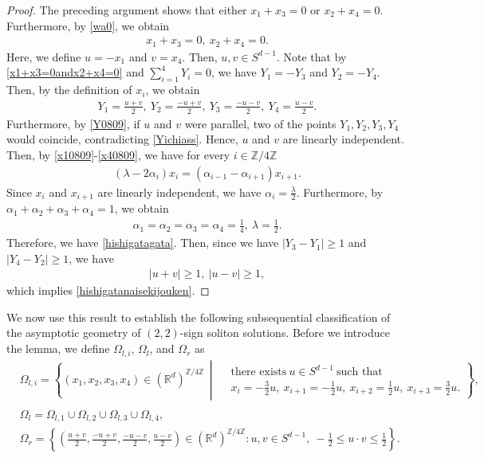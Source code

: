 \documentclass[reqno]{amsart}
\theoremstyle{plain}
\theoremstyle{definition}
\numberwithin{equation}{section}
\begin{document}
\begin{proof}
The preceding argument shows that either $x_1+x_3=0$ or $x_2+x_4=0$. Furthermore, by \eqref{wa0}, we obtain
\begin{align}\label{x1+x3=0andx2+x4=0}
x_1+x_3=0,\ x_2+x_4=0.
\end{align}
Here, we define $u=-x_1$ and $v=x_4$. Then, $u,v\in S^{d-1}$. Note that by \eqref{x1+x3=0andx2+x4=0} and $\sum_{i=1}^4Y_i=0$, we have $Y_1=-Y_3$ and $Y_2=-Y_4$. Then, by the definition of $x_i$, we obtain
\begin{align}\label{Y0809}
Y_1=\frac{u+v}{2},\ Y_2=\frac{-u+v}{2},\ Y_3=\frac{-u-v}{2},\ Y_4=\frac{u-v}{2}.
\end{align}
Furthermore, by \eqref{Y0809}, if $u$ and $v$ were parallel, two of the points $Y_1,Y_2,Y_3,Y_4$ would coincide,
contradicting \eqref{Yichiass}. Hence, $u$ and $v$ are linearly independent. Then, by \eqref{x10809}-\eqref{x40809}, we have for every $i\in\mathbb{Z}/4\mathbb{Z}$
\begin{align*}
\left(\lambda-2\alpha_i\right)x_i=\left(\alpha_{i-1}-\alpha_{i+1}\right)x_{i+1}.
\end{align*}
Since $x_i$ and $x_{i+1}$ are linearly independent, we have $\alpha_i=\frac{\lambda}{2}$. Furthermore, by $\alpha_1+\alpha_2+\alpha_3+\alpha_4=1$, we obtain
\begin{align*}
\alpha_1=\alpha_2=\alpha_3=\alpha_4=\frac{1}{4},\ \lambda=\frac{1}{2}.
\end{align*}
Therefore, we have \eqref{hishigatagata}. Then, since we have $|Y_3-Y_1|\geq 1$ and $|Y_4-Y_2|\geq 1$, we have
\begin{align*}
|u+v|\geq 1,\ |u-v|\geq 1,
\end{align*}
which implies \eqref{hishigatanaisekijouken}.
\end{proof}


We now use this result to establish the following subsequential classification of the asymptotic geometry of $(2,2)$-sign soliton solutions. Before we introduce the lemma, we define $\Omega_{l,i}$, $\Omega_l$, and $\Omega_r$ as 
\begin{align*}
&\Omega_{l,i}
=
\left\{
(x_1,x_2,x_3,x_4)\in \left(\mathbb{R}^d\right)^{\mathbb{Z}/4\mathbb{Z}}
\,\middle|\,
\begin{aligned}
&\mbox{there exists}\ u\in S^{d-1}\ \mbox{such that} \\
&x_i=-\frac{3}{2}u,\ x_{i+1}=-\frac{1}{2}u,\ x_{i+2}=\frac{1}{2}u,\ x_{i+3}=\frac{3}{2}u.
\end{aligned}
\right\},
\\
\\
&\Omega_l=\Omega_{l,1}\cup \Omega_{l,2}\cup \Omega_{l,3}\cup \Omega_{l,4},
\\
&\Omega_r=\left\{\left(\frac{u+v}{2},\frac{-u+v}{2},\frac{-u-v}{2},\frac{u-v}{2}\right)\in \left(\mathbb{R}^d\right)^{\mathbb{Z}/4\mathbb{Z}}: u,v\in S^{d-1},\ -\frac{1}{2}\leq u\cdot v\leq \frac{1}{2}\right\}.
\end{align*}
\end{document}
